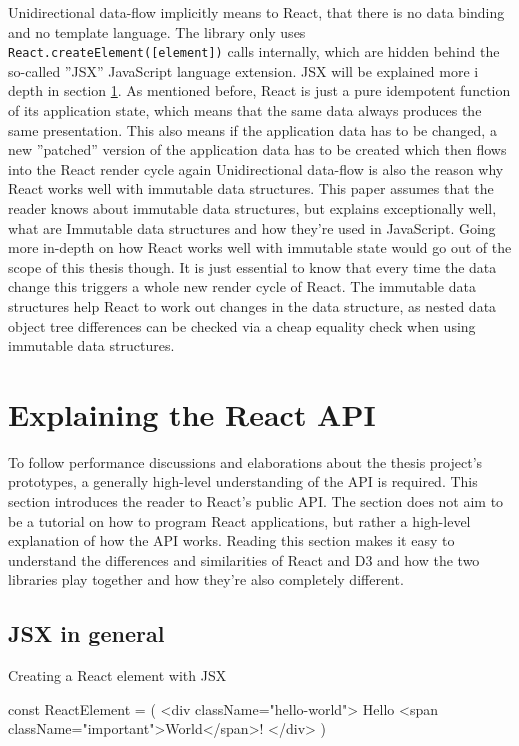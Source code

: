 Unidirectional data-flow implicitly means to React, that there is no data binding and no template language. The library only uses \texttt{React.createElement([element])} calls internally, which are hidden behind the so-called ''JSX'' JavaScript language extension. JSX will be explained more i depth in section \ref{sec:reactApi}. As mentioned before, React is just a pure idempotent function of its application state, which means that the same data always produces the same presentation. This also means if the application data has to be changed, a new ''patched'' version of the application data has to be created which then flows into the React render cycle again Unidirectional data-flow is also the reason why React works well with immutable data structures. This paper assumes that the reader knows about immutable data structures, but \cite{ImmutableJS} explains exceptionally well, what are Immutable data structures and how they're used in JavaScript. Going more in-depth on how React works well with immutable state would go out of the scope of this thesis though. It is just essential to know that every time the data change this triggers a whole new render cycle of React. The immutable data structures help React to work out changes in the data structure, as nested data object tree differences can be checked via a cheap equality check when using immutable data structures.

\section{Explaining the React API}
\label{sec:reactApi}

To follow performance discussions and elaborations about the thesis project's prototypes, a generally high-level understanding of the API is required. This section introduces the reader to React's public API. The section does not aim to be a tutorial on how to program React applications, but rather a high-level explanation of how the API works. Reading this section makes it easy to understand the differences and similarities of React and D3 and how the two libraries play together and how they're also completely different.

\subsection{JSX in general}

\begin{program}
\caption{Creating a React element with JSX} 
\label{prog:reactJsxElement}
\begin{JsCode}
const ReactElement = (
  <div className="hello-world">
    Hello <span className="important">World</span>!
  </div>
)
\end{JsCode}
\end{program}

